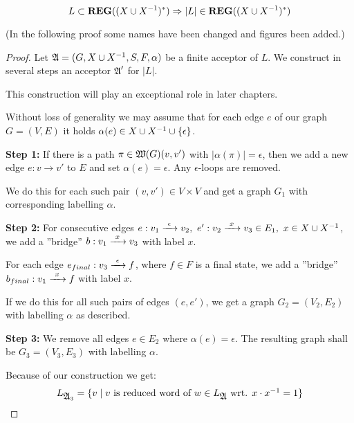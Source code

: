 \begin{lemma}
\[ L \subset \mbox{{\bf REG}}((X \cup {X}^{-1})^*) \Rightarrow |L| \in 
\mbox{{\bf REG}}((X \cup {X}^{-1})^*) \]
\end{lemma}

(In the following proof some names have been changed and figures been added.)

\begin{proof}
Let $\mbox{$\mathfrak{A}$} = (G, X \cup {X}^{-1}, S, F, \alpha)$ be a finite acceptor of $L$. We
construct in several steps an acceptor $\mbox{$\mathfrak{A}$}'$ for $|L|$.

This construction will play an exceptional role in later chapters.

Without loss of generality we may assume that for each edge $e$ of our graph $G
= (V, E)$ it holds $\alpha(e) \in X \cup {X}^{-1} \cup \mbox{$\{\epsilon\}$}$.

{\bf Step 1:} If there is a path $\pi \in \mbox{$\mathfrak{W}({G})$}(v, v')$ with
$|\alpha(\pi)| = \epsilon$, then we add a new edge $e: v \to v'$ to $E$ and set
$\alpha(e) = \epsilon$. Any $\epsilon$-loops are removed.

\begin{center}

\end{center}

We do this for each such pair $(v, v')\in V \times V$ and get a graph $G_1$ with
corresponding labelling $\alpha$.

{\bf Step 2:} For consecutive edges $e: v_1 \xrightarrow{\ {\epsilon}\ } v_2,\ e': v_2
\xrightarrow{\ {x}\ } v_3 \in E_1,\ x \in X \cup {X}^{-1}$, we add a ''bridge'' $b: v_1 \xrightarrow{\ {x}\ }
v_3$ with label $x$.

For each edge $e_{final}: v_3 \xrightarrow{\ {\epsilon}\ } f$, where $f \in F$ is a final
state, we add a ''bridge'' $b_{final}: v_1 \xrightarrow{\ {x}\ } f$ with label $x$.

\begin{center}

\end{center}

If we do this for all such pairs of edges $(e, e')$, we get a graph
$G_2=(V_2,E_2)$ with labelling $\alpha$ as described.

{\bf Step 3:} We remove all edges $e \in E_2$ where $\alpha(e) = \epsilon$. The
resulting graph shall be $G_3=(V_3,E_3)$ with labelling $\alpha$.

Because of our construction we get:
\[ L_{\mbox{$\mathfrak{A}$}_3} = \mbox{$\{v \mid v \mbox{ is reduced word of } w \in
L_{\mbox{$\mathfrak{A}$}} \mbox{ wrt. } x \cdot x^{-1} = 1\}$} \]


\end{proof}
